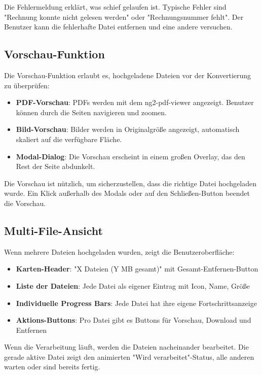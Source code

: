 Die Fehlermeldung erklärt, was schief gelaufen ist. Typische Fehler sind "Rechnung konnte nicht gelesen werden" oder "Rechnungsnummer fehlt". Der Benutzer kann die fehlerhafte Datei entfernen und eine andere versuchen.

\subsection{Vorschau-Funktion}

Die Vorschau-Funktion erlaubt es, hochgeladene Dateien vor der Konvertierung zu überprüfen:

\begin{itemize}
    \item \textbf{PDF-Vorschau}: PDFs werden mit dem ng2-pdf-viewer angezeigt. Benutzer können durch die Seiten navigieren und zoomen.
    \item \textbf{Bild-Vorschau}: Bilder werden in Originalgröße angezeigt, automatisch skaliert auf die verfügbare Fläche.
    \item \textbf{Modal-Dialog}: Die Vorschau erscheint in einem großen Overlay, das den Rest der Seite abdunkelt.
\end{itemize}

Die Vorschau ist nützlich, um sicherzustellen, dass die richtige Datei hochgeladen wurde. Ein Klick außerhalb des Modals oder auf den Schließen-Button beendet die Vorschau.

\subsection{Multi-File-Ansicht}

Wenn mehrere Dateien hochgeladen wurden, zeigt die Benutzeroberfläche:

\begin{itemize}
    \item \textbf{Karten-Header}: "X Dateien (Y MB gesamt)" mit Gesamt-Entfernen-Button
    \item \textbf{Liste der Dateien}: Jede Datei als eigener Eintrag mit Icon, Name, Größe
    \item \textbf{Individuelle Progress Bars}: Jede Datei hat ihre eigene Fortschrittsanzeige
    \item \textbf{Aktions-Buttons}: Pro Datei gibt es Buttons für Vorschau, Download und Entfernen
\end{itemize}

Wenn die Verarbeitung läuft, werden die Dateien nacheinander bearbeitet. Die gerade aktive Datei zeigt den animierten "Wird verarbeitet"-Status, alle anderen warten oder sind bereits fertig.

